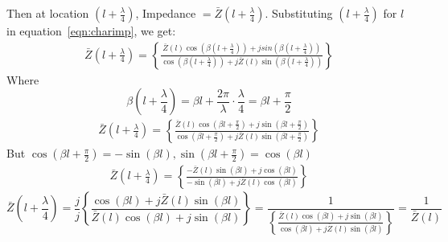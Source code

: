 Then at location ${(l+\frac{\lambda}{4})}$, Impedance  $=\bar{Z}(l+\frac{\lambda}{4})$. Substituting ${(l+\frac{\lambda}{4})}$ for $l$ in equation~\ref{eqn:charimp}, we get:
\begin{align*}
\bar{Z}\left(l+\frac{\lambda}{4}\right) = \left\lbrace \frac{\bar{Z}(l)\cos(\beta (l+\frac{\lambda}{4})) + jsin(\beta (l+\frac{\lambda}{4}))}{\cos(\beta (l+\frac{\lambda}{4})) + j\bar{Z}(l)\sin(\beta (l+\frac{\lambda}{4}))}\right\rbrace 
\end{align*}
Where 
\begin{dmath*}
\beta(l + \frac{\lambda}{4})=\beta l + \frac{2\pi}{\lambda} \cdot \frac{\lambda}{4} = \beta l + \frac{\pi}{2}
\end{dmath*}
\begin{align*} 
\bar{Z}\left(l+\frac{\lambda}{4}\right) = \left\lbrace \frac{\bar{Z}(l)\cos(\beta l + \frac{\pi}{2}) + j\sin(\beta l + \frac{\pi}{2})}{\cos(\beta l + \frac{\pi}{2}) + j\bar{Z}(l)\sin(\beta l + \frac{\pi}{2})}\right\rbrace
\end{align*}
But $\cos(\beta l + \frac{\pi}{2})= -\sin(\beta l), \sin(\beta l+\frac{\pi}{2})=\cos(\beta l)$
\begin{align*} 
\bar{Z}\left(l+\frac{\lambda}{4}\right) = \left\lbrace \frac{-\bar{Z}(l)\sin(\beta l) + j\cos(\beta l)}{-\sin(\beta l) + j\bar{Z}(l) \cos(\beta l)}\right\rbrace
\end{align*}
\begin{dmath*}
\bar{Z}\left(l+\frac{\lambda}{4}\right) =\frac{j}{j} \left\lbrace \frac{\cos(\beta l) + j\bar{Z}(l)\sin(\beta l)}{\bar{Z}(l)\cos(\beta l) + j\sin(\beta l)}\right\rbrace 
= \frac{1}{\left\lbrace \frac{\bar{Z}(l)\cos(\beta l) + j\sin(\beta l)}{\cos(\beta l) + j\bar{Z}(l)\sin(\beta l)}\right\rbrace} 
=\frac{1}{\bar{Z}(l)}
\end{dmath*}


